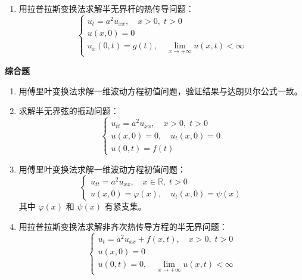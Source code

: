 \begin{enumerate}
    \item 用拉普拉斯变换法求解半无界杆的热传导问题：
    \begin{equation}
        \begin{cases}
            u_t = a^2 u_{xx}, \quad x > 0, \; t > 0 \\
            u(x, 0) = 0 \\
            u_x(0, t) = g(t), \quad \lim_{x\to+\infty} u(x, t) < \infty
        \end{cases}
    \end{equation}
\end{enumerate}

\textbf{综合题}

\begin{enumerate}[resume]
    \item 用傅里叶变换法求解一维波动方程初值问题，验证结果与达朗贝尔公式一致。
    
    \item 求解半无界弦的振动问题：
    \begin{equation}
        \begin{cases}
            u_{tt} = a^2u_{xx}, \quad x > 0, \; t > 0 \\
            u(x, 0) = 0, \quad u_t(x, 0) = 0 \\
            u(0, t) = f(t)
        \end{cases}
    \end{equation}
    
    \item 用傅里叶变换法求解一维波动方程初值问题：
    \begin{equation}
        \begin{cases}
            u_{tt} = a^2 u_{xx}, \quad x \in \mathbb{R}, \; t > 0 \\
            u(x, 0) = \varphi(x), \quad u_t(x, 0) = \psi(x)
        \end{cases}
    \end{equation}
    其中 $\varphi(x)$ 和 $\psi(x)$ 有紧支集。
    
    \item 用拉普拉斯变换法求解非齐次热传导方程的半无界问题：
    \begin{equation}
        \begin{cases}
            u_t = a^2 u_{xx} + f(x,t), \quad x > 0, \; t > 0 \\
            u(x, 0) = 0 \\
            u(0, t) = 0, \quad \lim_{x\to+\infty} u(x, t) < \infty
        \end{cases}
    \end{equation}
    

\end{enumerate}
